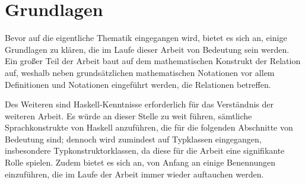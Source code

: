 \section{Grundlagen}


\label{sec:grundlagen}

Bevor auf die eigentliche Thematik eingegangen wird, bietet es sich an, einige Grundlagen zu klären, die im Laufe dieser Arbeit
von Bedeutung sein werden. Ein großer Teil der Arbeit baut auf dem mathematischen Konstrukt der Relation auf, weshalb neben
grundsätzlichen mathematischen Notationen vor allem Definitionen und Notationen eingeführt werden, die Relationen betreffen.

Des Weiteren sind Haskell-Kenntnisse erforderlich für das Verständnis der weiteren Arbeit. Es würde an dieser Stelle zu weit führen, sämtliche Sprachkonstrukte von
Haskell anzuführen, die für die folgenden Abschnitte von Bedeutung sind; dennoch wird zumindest auf Typklassen eingegangen, insbesondere Typkonstruktorklassen,
da diese für die Arbeit eine signifikante Rolle spielen. Zudem bietet es sich an, von Anfang an einige Benennungen einzuführen, die im Laufe der
Arbeit immer wieder auftauchen werden.




